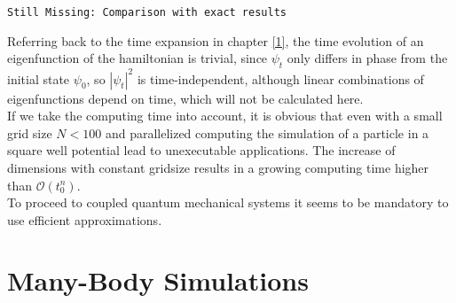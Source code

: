 \documentclass[twoside,        %
			   12pt,			%
               BCOR10mm,       %
               ngerman,english  %
               ]{scrartcl}
\begin{document}
\begin{lstlisting}
Still Missing: Comparison with exact results
\end{lstlisting}

Referring back to the time expansion in chapter \ref{1}, the time evolution of an eigenfunction of the hamiltonian is trivial, since $\psi_t$ only differs in phase from the initial state $\psi_0$, so ${|\psi_t|}^2$ is time-independent, although linear combinations of eigenfunctions depend on time, which will not be calculated here.\\

If we take the computing time into account, it is obvious that even with a small grid size $N<100$ and parallelized computing the simulation of a particle in a square well potential lead to unexecutable applications. The increase of dimensions with constant gridsize results in a growing computing time higher than $\mathcal O (t_0^n)$. \\

To proceed to coupled quantum mechanical systems it seems to be mandatory to use efficient approximations.




\section{Many-Body Simulations}
    
\end{document}

